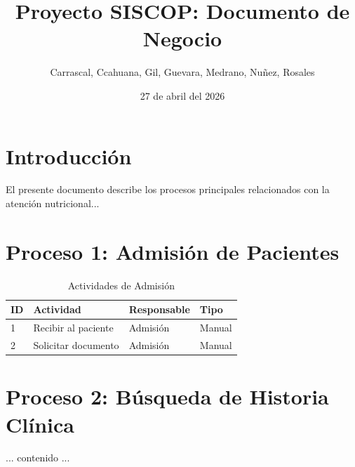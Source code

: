 \documentclass[12pt, a4paper]{article}
\title{Proyecto SISCOP: Documento de Negocio}
\author{Carrascal, Ccahuana, Gil, Guevara, Medrano, Nuñez, Rosales}
\date{27 de abril del 2026}
\begin{document}
\maketitle %
\newpage %

\tableofcontents %
\newpage

\section{Introducción}
El presente documento describe los procesos principales relacionados con la atención nutricional...

\section{Proceso 1: Admisión de Pacientes}
\begin{table}[h]
\centering
\begin{tabular}{|l|l|l|l|}
\hline
ID & Actividad & Responsable & Tipo \\ \hline
1 & Recibir al paciente & Admisión & Manual \\ \hline
2 & Solicitar documento & Admisión & Manual \\ \hline
\end{tabular}
\caption{Actividades de Admisión}
\end{table}

\newpage %
\section{Proceso 2: Búsqueda de Historia Clínica}
... contenido ...
\end{document}
